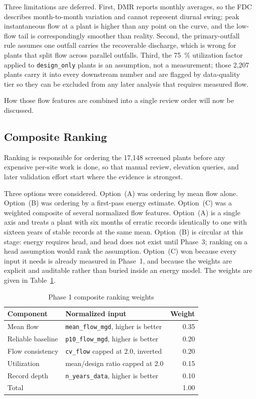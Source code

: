 \documentclass[12pt,letterpaper]{report}
\begin{document}
Three limitations are deferred. First, DMR reports monthly averages, so the FDC
describes month-to-month variation and cannot represent diurnal swing; peak
instantaneous flow at a plant is higher than any point on the curve, and the
low-flow tail is correspondingly smoother than reality. Second, the
primary-outfall rule assumes one outfall carries the recoverable discharge, which
is wrong for plants that split flow across parallel outfalls. Third, the 75~\%
utilization factor applied to \texttt{design\_only} plants is an assumption, not
a measurement; those 2{,}207 plants carry it into every downstream number and are
flagged by data-quality tier so they can be excluded from any later analysis that
requires measured flow.

How those flow features are combined into a single review order will now be discussed.

\subsection{Composite Ranking}

Ranking is responsible for ordering the 17{,}148 screened plants before any
expensive per-site work is done, so that manual review, elevation queries, and
later validation effort start where the evidence is strongest.

Three options were considered. Option~(A) was ordering by mean flow alone.
Option~(B) was ordering by a first-pass energy estimate. Option~(C) was a
weighted composite of several normalized flow features. Option~(A) is a single
axis and treats a plant with six months of erratic records identically to one
with sixteen years of stable records at the same mean. Option~(B) is
circular at this stage: energy requires head, and head does not exist until
Phase~3; ranking on a head assumption would rank the assumption. Option~(C)
won because every input it needs is already measured in Phase~1, and because the
weights are explicit and auditable rather than buried inside an energy model.
The weights are given in Table~\ref{tab:rank_weights}.

\begin{table}[htbp]
\centering
\caption{Phase 1 composite ranking weights}
\label{tab:rank_weights}
\begin{tabular}{llr}
\toprule
Component & Normalized input & Weight \\
\midrule
Mean flow          & \texttt{mean\_flow\_mgd}, higher is better        & 0.35 \\
Reliable baseline  & \texttt{p10\_flow\_mgd}, higher is better         & 0.20 \\
Flow consistency   & \texttt{cv\_flow} capped at 2.0, inverted         & 0.20 \\
Utilization        & mean/design ratio capped at 2.0                   & 0.15 \\
Record depth       & \texttt{n\_years\_data}, higher is better         & 0.10 \\
\midrule
Total              &                                                   & 1.00 \\
\bottomrule
\end{tabular}
\end{table}
\end{document}
